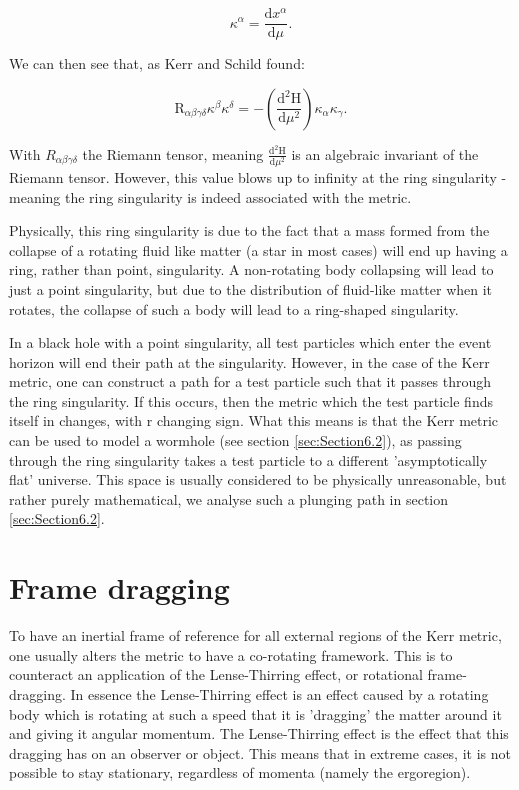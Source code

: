 \documentclass[oneside,openright,frontopenright, singlespacing]{dmathesis}
\begin{document}
	\[\kappa^\alpha=\frac{\mbox{d}x^\alpha}{\mbox{d}\mu}.\]

	We can then see that, as Kerr and Schild found:

	\[\mbox{R}_{\alpha\beta\gamma\delta}\kappa^\beta\kappa^\delta = -\left(\frac{\mbox{d}^2\mbox{H}}{\mbox{d}\mu^2}\right)\kappa_\alpha\kappa_\gamma.\]

	With $R_{\alpha\beta\gamma\delta}$ the Riemann tensor, meaning $\frac{\mbox{d}^2\mbox{H}}{\mbox{d}\mu^2}$ is an algebraic invariant of the Riemann tensor. However, this value blows up to infinity at the ring singularity - meaning the ring singularity is indeed associated with the metric.

\vspace{1em}
	Physically, this ring singularity is due to the fact that a mass formed from the collapse of a rotating fluid like matter (a star in most cases) will end up having a ring, rather than point, singularity. A non-rotating body collapsing will lead to just a point singularity, but due to the distribution of fluid-like matter when it rotates, the collapse of such a body will lead to a ring-shaped singularity.

\vspace{1em}
	In a black hole with a point singularity, all test particles which enter the event horizon will end their path at the singularity. However, in the case of the Kerr metric, one can construct a path for a test particle such that it passes through the ring singularity. If this occurs, then the metric which the test particle finds itself in changes, with r changing sign. What this means is that the Kerr metric can be used to model a wormhole (see section \ref{sec:Section6.2}), as passing through the ring singularity takes a test particle to a different 'asymptotically flat' universe. This space is usually considered to be physically unreasonable, but rather purely mathematical, we analyse such a plunging path in section \ref{sec:Section6.2}.

\section{Frame dragging}\label{sec:Section4.4}

	To have an inertial frame of reference for all external regions of the Kerr metric, one usually alters the metric to have a co-rotating framework. This is to counteract an application of the Lense-Thirring effect, or rotational frame-dragging. In essence the Lense-Thirring effect is an effect caused by a rotating body which is rotating at such a speed that it is 'dragging' the matter around it and giving it angular momentum. The Lense-Thirring effect is the effect that this dragging has on an observer or object. This means that in extreme cases, it is not possible to stay stationary, regardless of momenta (namely the ergoregion).
\end{document}
